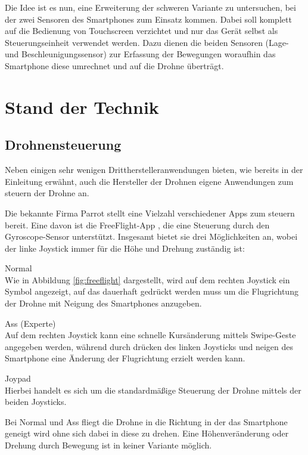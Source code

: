 \documentclass{article}
\begin{document}
Die Idee ist es nun, eine Erweiterung der schweren Variante zu untersuchen, bei der zwei Sensoren des Smartphones zum Einsatz kommen. Dabei soll komplett auf die Bedienung von Touchscreen verzichtet und nur das Gerät selbst als Steuerungseinheit verwendet werden. Dazu dienen die beiden Sensoren (Lage- und Beschleunigungssensor) zur Erfassung der Bewegungen\cite{milker2012bewegungserkennung} woraufhin das Smartphone diese umrechnet und auf die Drohne überträgt. 

\section{Stand der Technik}
\label{sec:verwandteArbeiten}
\subsection{Drohnensteuerung}
Neben einigen sehr wenigen Drittherstelleranwendungen bieten, wie bereits in der Einleitung erwähnt, auch die Hersteller der Drohnen eigene Anwendungen zum steuern der Drohne an.

Die bekannte Firma Parrot stellt eine Vielzahl verschiedener Apps zum steuern bereit. Eine davon ist die FreeFlight-App \cite{freeflightapp}, die eine Steuerung durch den Gyroscope-Sensor unterstützt. Insgesamt bietet sie drei Möglichkeiten an, wobei der linke Joystick immer für die Höhe und Drehung zuständig ist:
\begin{description}
\item Normal \\
Wie in Abbildung \ref{fig:freeflight} dargestellt, wird auf dem rechten Joystick ein Symbol angezeigt, auf das dauerhaft gedrückt werden muss um die Flugrichtung der Drohne mit Neigung des Smartphones anzugeben.
\item Ass (Experte) \\
Auf dem rechten Joystick kann eine schnelle Kursänderung mittels Swipe-Geste angegeben werden, während durch drücken des linken Joysticks und neigen des Smartphone eine Änderung der Flugrichtung erzielt werden kann.
\item Joypad\\
Hierbei handelt es sich um die standardmäßige Steuerung der Drohne mittels der beiden Joysticks.
\end{description}

Bei Normal und Ass fliegt die Drohne in die Richtung in der das Smartphone geneigt wird ohne sich dabei in diese zu drehen. Eine Höhenveränderung oder Drehung durch Bewegung ist in keiner Variante möglich. 
\end{document}
